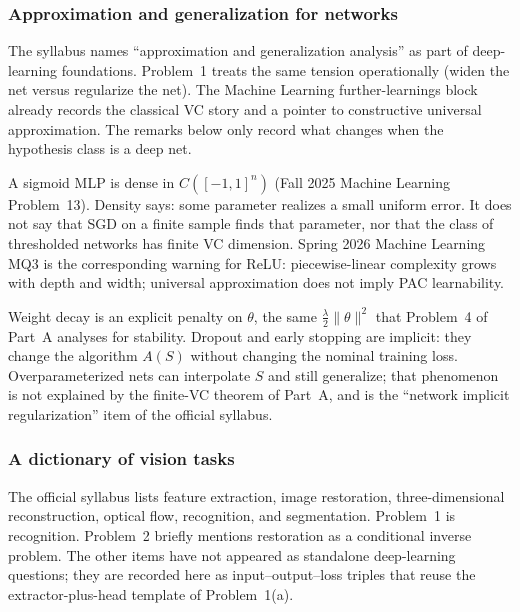 \subsubsection{Approximation and generalization for networks}
\label{subsubsec:dlu-approx}

The syllabus names ``approximation and generalization analysis'' as part of deep-learning foundations. Problem~1 treats the same tension operationally (widen the net versus regularize the net). The Machine Learning further-learnings block already records the classical VC story and a pointer to constructive universal approximation. The remarks below only record what changes when the hypothesis class is a deep net.

\begin{remark}
\label{rem:dlu-ua-not-pac}
A sigmoid MLP is dense in \(C([-1,1]^n)\) (Fall 2025 Machine Learning Problem~13). Density says: some parameter realizes a small uniform error. It does not say that SGD on a finite sample finds that parameter, nor that the class of thresholded networks has finite VC dimension. Spring 2026 Machine Learning MQ3 is the corresponding warning for ReLU: piecewise-linear complexity grows with depth and width; universal approximation does not imply PAC learnability.
\end{remark}

\begin{remark}
\label{rem:dlu-two-reg}
Weight decay is an explicit penalty on \(\theta\), the same \(\tfrac{\lambda}{2}\|\theta\|^2\) that Problem~4 of Part~A analyses for stability. Dropout and early stopping are implicit: they change the algorithm \(A(S)\) without changing the nominal training loss. Overparameterized nets can interpolate \(S\) and still generalize; that phenomenon is not explained by the finite-VC theorem of Part~A, and is the ``network implicit regularization'' item of the official syllabus.
\end{remark}


\subsubsection{A dictionary of vision tasks}
\label{subsubsec:dlu-vision}

The official syllabus lists feature extraction, image restoration, three-dimensional reconstruction, optical flow, recognition, and segmentation. Problem~1 is recognition. Problem~2 briefly mentions restoration as a conditional inverse problem. The other items have not appeared as standalone deep-learning questions; they are recorded here as input--output--loss triples that reuse the extractor-plus-head template of Problem~1(a).

